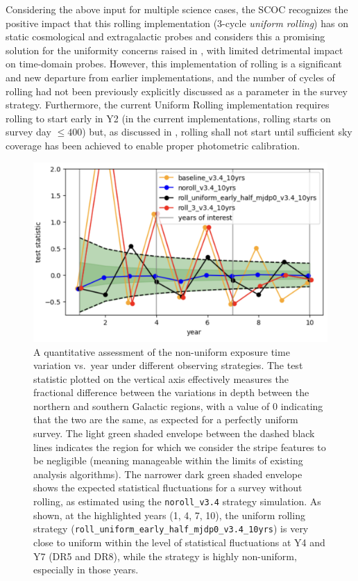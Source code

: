 Considering the above input for multiple science cases, the SCOC recognizes the positive impact that this rolling implementation (3-cycle {\it uniform rolling}) has on static cosmological and extragalactic probes and considers this a promising solution for the uniformity concerns raised in , with limited detrimental impact on time-domain probes. However, this implementation of rolling is a significant and new departure from earlier implementations, and the number of cycles of rolling had not been previously explicitly discussed as a parameter in the survey strategy. Furthermore, the current Uniform Rolling implementation requires rolling to start early in Y2 (in the current implementations, rolling starts on survey day $\leq 400$) but, as discussed in , rolling shall not start until sufficient sky coverage has been achieved to enable proper photometric calibration.%
\begin{figure}
  \centering
    \includegraphics[width=0.75\linewidth]{figures/stripiness_metric.png}
    \caption{
    A quantitative assessment of the non-uniform exposure time variation vs.\ year under different observing strategies.  The test statistic plotted on the vertical axis effectively measures the fractional difference between the variations in depth between the northern and southern Galactic regions, with a value of 0 indicating that the two are the same, as expected for a perfectly uniform survey.  The light green shaded envelope between the dashed black lines indicates the region for which we consider the stripe features to be negligible (meaning manageable within the limits of existing analysis algorithms).   The narrower dark green shaded envelope shows the expected statistical fluctuations for a survey without rolling, as estimated using the \texttt{noroll\_v3.4} strategy simulation.  As shown, at the highlighted years (1, 4, 7, 10), the uniform rolling strategy (\texttt{roll\_uniform\_early\_half\_mjdp0\_v3.4\_10yrs}) is very close to uniform within the level of statistical fluctuations at Y4 and Y7 (DR5 and DR8), while the  strategy is highly non-uniform, especially in those years.
}
    \label{fig:stripiness}
\end{figure}
